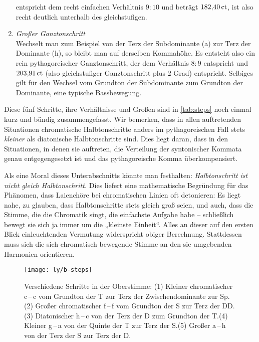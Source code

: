 \begin{enumerate}
  entspricht dem recht einfachen Verhältnis \mbox{$9:10$} und beträgt $182{,}40\,\text{ct}$,
  ist also recht deutlich unterhalb des gleichstufigen.
\item \emph{Großer Ganztonschritt}\\
  Wechselt man zum Beispiel von der Terz der Subdominante (\naturalm a) zur Terz
  der Dominante (\naturalm h), so bleibt man auf derselben Kommahöhe. Es
  entsteht also ein rein pythagoreischer Ganztonschritt, der dem Verhältnis
  $8:9$ entspricht und $203{,}91\,\text{ct}$ (also gleichstufiger Ganztonschritt plus
  $2$ Grad) entspricht.  Selbiges gilt für den Wechsel vom Grundton der
  Subdominante zum Grundton der Dominante, eine typische Bassbewegung.
\end{enumerate}
Diese fünf Schritte, ihre Verhältnisse und Großen sind in \cref{tab:steps} noch
einmal kurz und bündig zusammengefasst.  Wir bemerken, dass in allen
auftretenden Situationen chromatische Halbtonschritte anders im pythagoreischen
Fall stets \emph{kleiner} als diatonische Halbtonschritte sind.  Dies liegt
daran, dass in den Situationen, in denen sie auftreten, die Verteilung der
syntonischer Kommata genau entgegengesetzt ist und das pythagoreische Komma
überkompensiert.

Als eine Moral dieses Unterabschnitts könnte man festhalten:
\emph{Halbtonschritt ist nicht gleich Halbtonschritt.}  Dies liefert eine
mathematische Begründung für das Phänomen, dass Laienchöre bei chromatischen
Linien oft detonieren: Es liegt nahe, zu glauben, dass Halbtonschritte stets
gleich groß seien, und auch, dass die Stimme, die die Chromatik singt, die
einfachste Aufgabe habe – schließlich bewegt sie sich ja immer um die „kleinste
Einheit“. Alles an dieser auf den ersten Blick einleuchtenden Vermutung
widerspricht obiger Berechnung.  Stattdessen muss sich die sich chromatisch
bewegende Stimme an den sie umgebenden Harmonien orientieren.

\begin{figure}
  \centering
  \texttt{[image: ly/b-steps]}
  \caption{Verschiedene Schritte in der Oberstimme: (1) Kleiner chromatischer
     c\,–\,\sharpmm c vom Grundton der T zur Terz der Zwischendominante
    zur Sp.\quad (2) Großer chromatischer  f\,–\,\sharpm f vom Grundton
    der S zur Terz der DD.\quad (3) Diatonischer  \naturalm h\,–\,c von
    der Terz der D zum Grundton der T.\quad (4) Kleiner 
    g\,–\,\naturalm a von der Quinte der T zur Terz der S.\quad (5) Großer
     \naturalm a\,–\,\naturalm h von der Terz der S zur Terz der
    D.}\label{fig:steps}
\end{figure}

